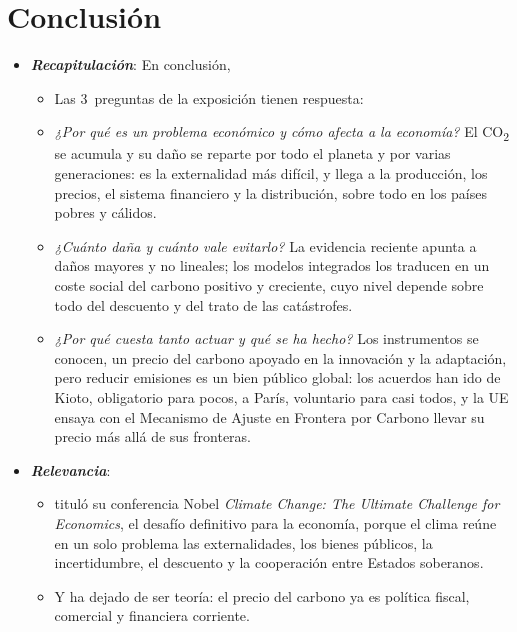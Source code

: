 \documentclass[11pt]{article}
\begin{document}
\section*{Conclusión}

\begin{itemize}
\item \textbf{\emph{Recapitulación}}: En conclusión,
  \begin{itemize}
  \item Las 3~preguntas de la exposición tienen respuesta:
  \item \emph{¿Por qué es un problema económico y cómo afecta a la economía?} El CO\textsubscript{2} se acumula y su daño se reparte por todo el planeta y por varias generaciones: es la externalidad más difícil, y llega a la producción, los precios, el sistema financiero y la distribución, sobre todo en los países pobres y cálidos.
  \item \emph{¿Cuánto daña y cuánto vale evitarlo?} La evidencia reciente apunta a daños mayores y no lineales; los modelos integrados los traducen en un coste social del carbono positivo y creciente, cuyo nivel depende sobre todo del descuento y del trato de las catástrofes.
  \item \emph{¿Por qué cuesta tanto actuar y qué se ha hecho?} Los instrumentos se conocen, un precio del carbono apoyado en la innovación y la adaptación, pero reducir emisiones es un bien público global: los acuerdos han ido de Kioto, obligatorio para pocos, a París, voluntario para casi todos, y la UE ensaya con el Mecanismo de Ajuste en Frontera por Carbono llevar su precio más allá de sus fronteras.
  \end{itemize}

\item \textbf{\emph{Relevancia}}:
  \begin{itemize}
  \item \textcite{Nordhaus2019Climate} tituló su conferencia Nobel \emph{Climate Change: The Ultimate Challenge for Economics}, el desafío definitivo para la economía, porque el clima reúne en un solo problema las externalidades, los bienes públicos, la incertidumbre, el descuento y la cooperación entre Estados soberanos.

  \item Y ha dejado de ser teoría: el precio del carbono ya es política fiscal, comercial y financiera corriente.
  \end{itemize}


\end{itemize}
\end{document}
